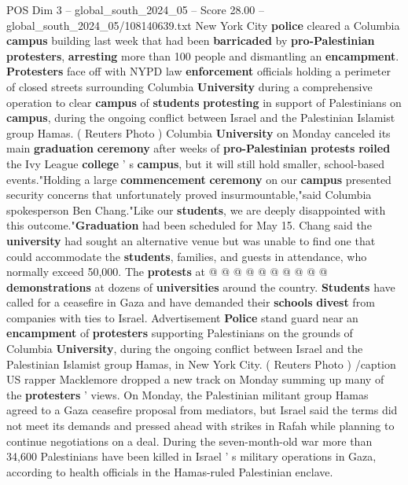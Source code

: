 \begin{textsample}{POS Dim 3 – global\_south\_2024\_05 – Score 28.00 – global\_south\_2024\_05/108140639.txt}  \label{ex:f3_pos_092}
New York City \textbf{police} cleared a Columbia \textbf{campus} building last week that had been \textbf{barricaded} by \textbf{pro-Palestinian} \textbf{protesters}, \textbf{arresting} more than 100 people and dismantling an \textbf{encampment}. \textbf{Protesters} face off with NYPD law \textbf{enforcement} officials holding a perimeter of closed streets surrounding Columbia \textbf{University} during a comprehensive operation to clear \textbf{campus} of \textbf{students} \textbf{protesting} in support of Palestinians on \textbf{campus}, during the ongoing conflict between Israel and the Palestinian Islamist group Hamas. ( Reuters Photo ) Columbia \textbf{University} on Monday canceled its main \textbf{graduation} \textbf{ceremony} after weeks of \textbf{pro-Palestinian} \textbf{protests} \textbf{roiled} the Ivy League \textbf{college} ' s \textbf{campus}, but it will still hold smaller, school-based events."Holding a large \textbf{commencement} \textbf{ceremony} on our \textbf{campus} presented security concerns that unfortunately proved insurmountable,"said Columbia spokesperson Ben Chang."Like our \textbf{students}, we are deeply disappointed with this outcome."\textbf{Graduation} had been scheduled for May 15.
Chang said the \textbf{university} had sought an alternative venue but was unable to find one that could accommodate the \textbf{students}, families, and guests in attendance, who normally exceed 50,000.
The \textbf{protests} at @ @ @ @ @ @ @ @ @ @ \textbf{demonstrations} at dozens of \textbf{universities} around the country. \textbf{Students} have called for a ceasefire in Gaza and have demanded their \textbf{schools} \textbf{divest} from companies with ties to Israel.
Advertisement \textbf{Police} stand guard near an \textbf{encampment} of \textbf{protesters} supporting Palestinians on the grounds of Columbia \textbf{University}, during the ongoing conflict between Israel and the Palestinian Islamist group Hamas, in New York City. ( Reuters Photo ) /caption US rapper Macklemore dropped a new track on Monday summing up many of the \textbf{protesters} ' views.
On Monday, the Palestinian militant group Hamas agreed to a Gaza ceasefire proposal from mediators, but Israel said the terms did not meet its demands and pressed ahead with strikes in Rafah while planning to continue negotiations on a deal.
During the seven-month-old war more than 34,600 Palestinians have been killed in Israel ' s military operations in Gaza, according to health officials in the Hamas-ruled Palestinian enclave.

\end{textsample}
